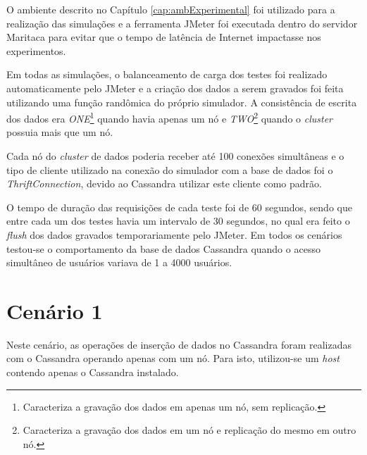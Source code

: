 O ambiente descrito no Capítulo \ref{cap:ambExperimental} foi utilizado para a realização das simulações e a ferramenta JMeter foi executada dentro do servidor Maritaca para evitar que o tempo de latência de Internet impactasse nos experimentos.

Em todas as simulações, o balanceamento de carga dos testes foi realizado automaticamente pelo JMeter e a criação dos dados a serem gravados foi feita utilizando uma função randômica do próprio simulador. A consistência de escrita dos dados era \textit{ONE}\footnote{Caracteriza a gravação dos dados em apenas um nó, sem replicação.} quando havia apenas um nó e \textit{TWO}\footnote{Caracteriza a gravação dos dados em um nó e replicação do mesmo em outro nó.} quando o \textit{cluster} possuia mais que um nó. 

Cada nó do \textit{cluster} de dados poderia receber até 100 conexões simultâneas e o tipo de cliente utilizado na conexão do simulador com a base de dados foi o \textit{ThriftConnection}, devido ao Cassandra utilizar este cliente como padrão.

O tempo de duração das requisições de cada teste foi de 60 segundos, sendo que entre cada um dos testes havia um intervalo de 30 segundos, no qual era feito o \textit{flush} dos dados gravados temporariamente pelo JMeter. Em todos os cenários testou-se o comportamento da base de dados Cassandra quando o acesso simultâneo de usuários variava de 1 a 4000 usuários.

\section{Cenário 1}

Neste cenário, as operações de inserção de dados no Cassandra foram realizadas com o Cassandra operando apenas com um nó.
Para isto, utilizou-se um \textit{host} contendo apenas o Cassandra instalado.

